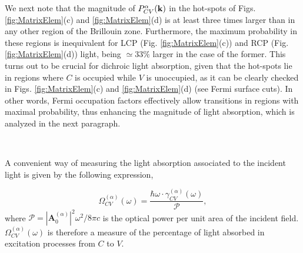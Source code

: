 \documentclass[aps,prb,showpacs,preprintnumbers,twocolumn,amsmath,amssymb]{revtex4-1}
\begin{document}
We next note that the magnitude of $P^{\alpha}_{CV}(\bf k)$ in the hot-spots of Figs. \ref{fig:MatrixElem}(c) and \ref{fig:MatrixElem}(d) is at least three times larger than in any other region of the Brillouin zone. Furthermore, the maximum probability in these regions is inequivalent for LCP (Fig. \ref{fig:MatrixElem}(c)) and RCP (Fig. \ref{fig:MatrixElem}(d)) light, being $\simeq 33\%$ larger in the case of the former. This turns out to be crucial for dichroic light absorption, given that the hot-spots lie in regions where $C$ is occupied while $V$ is unoccupied, as it can be clearly checked in Figs. \ref{fig:MatrixElem}(c) and \ref{fig:MatrixElem}(d) (see Fermi surface cuts). In other words, Fermi occupation factors effectively allow transitions  in regions with maximal probability, thus enhancing the magnitude of light absorption, which is analyzed in the next paragraph.

 
 \
 
A convenient way of measuring the light absorption associated to the incident light is given by the following expression,

\begin{equation}
\Omega^{(\alpha)}_{CV  }(\omega)= \frac{\hbar\omega\cdot\gamma^{(\alpha)}_{CV  }(\omega)}{\mathcal P }, 
\end{equation}
where ${\mathcal P}=|\textbf{A}^{(\alpha)}_{0}|^{2}\omega^{2}/8\pi c$ is the optical power per unit area of the incident field. $\Omega^{(\alpha)}_{CV  }(\omega)$ is therefore a measure of the percentage of light absorbed in excitation processes from $C$ to $V$.
\end{document}
